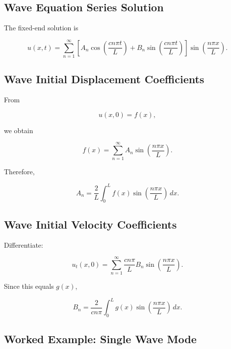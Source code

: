 \subsection{Wave Equation Series Solution}
\label{subsec:wave-series-solution}

The fixed-end solution is

\[
\boxed{
u(x,t)
=
\sum_{n=1}^{\infty}
\left[
A_n
\cos
\left(
\frac{cn\pi t}{L}
\right)
+
B_n
\sin
\left(
\frac{cn\pi t}{L}
\right)
\right]
\sin
\left(
\frac{n\pi x}{L}
\right).
}
\]

\subsection{Wave Initial Displacement Coefficients}
\label{subsec:wave-initial-displacement}

From

\[
u(x,0)=f(x),
\]

we obtain

\[
\boxed{
f(x)
=
\sum_{n=1}^{\infty}
A_n
\sin
\left(
\frac{n\pi x}{L}
\right).
}
\]

Therefore,

\[
\boxed{
A_n
=
\frac{2}{L}
\int_0^L
f(x)
\sin
\left(
\frac{n\pi x}{L}
\right)
\,dx.
}
\]

\subsection{Wave Initial Velocity Coefficients}
\label{subsec:wave-initial-velocity}

Differentiate:

\[
u_t(x,0)
=
\sum_{n=1}^{\infty}
\frac{cn\pi}{L}
B_n
\sin
\left(
\frac{n\pi x}{L}
\right).
\]

Since this equals \(g(x)\),

\[
\boxed{
B_n
=
\frac{2}{cn\pi}
\int_0^L
g(x)
\sin
\left(
\frac{n\pi x}{L}
\right)
\,dx.
}
\]

\subsection{Worked Example: Single Wave Mode}
\label{subsec:worked-single-wave-mode}

